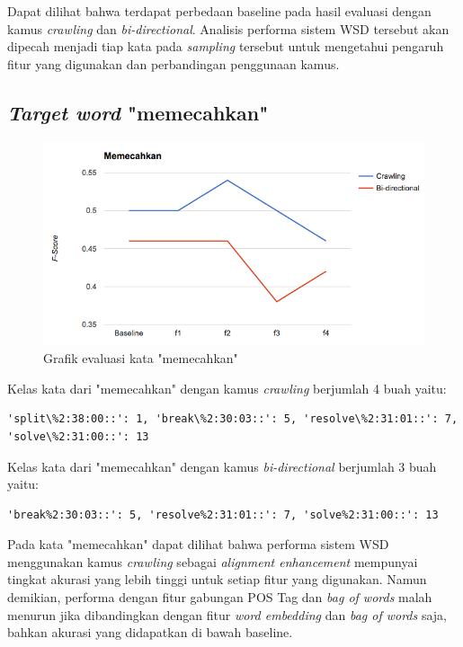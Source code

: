 Dapat dilihat bahwa terdapat perbedaan baseline pada hasil evaluasi dengan kamus \textit{crawling} dan \textit{bi-directional}. Analisis performa sistem WSD tersebut akan dipecah menjadi tiap kata pada \textit{sampling} tersebut untuk mengetahui pengaruh fitur yang digunakan dan perbandingan penggunaan kamus.

\subsection{\textit{Target word} "memecahkan"}

\begin{figure}
	\centering
	\includegraphics[width=1\linewidth]{adit_pics/memecahkan.png}
	\caption{Grafik evaluasi kata "memecahkan"}
	\label{fig:memecahkan}
\end{figure}

Kelas kata dari "memecahkan" dengan kamus \textit{crawling} berjumlah 4 buah yaitu:
\begin{lstlisting}
'split\%2:38:00::': 1, 'break\%2:30:03::': 5, 'resolve\%2:31:01::': 7, 'solve\%2:31:00::': 13
\end{lstlisting}
Kelas kata dari "memecahkan" dengan kamus \textit{bi-directional} berjumlah 3 buah yaitu:
\begin{lstlisting}
'break%2:30:03::': 5, 'resolve%2:31:01::': 7, 'solve%2:31:00::': 13
\end{lstlisting}

Pada kata "memecahkan" dapat dilihat bahwa performa sistem WSD menggunakan kamus \textit{crawling} sebagai \textit{alignment enhancement} mempunyai tingkat akurasi yang lebih tinggi untuk setiap fitur yang digunakan. Namun demikian, performa dengan fitur gabungan POS Tag dan \textit{bag of words} malah menurun jika dibandingkan dengan fitur \textit{word embedding} dan \textit{bag of words} saja, bahkan akurasi yang didapatkan di bawah baseline.

